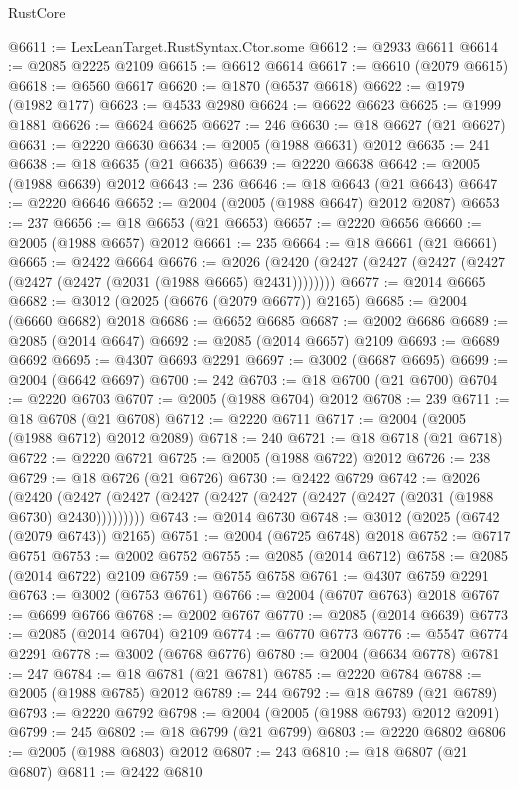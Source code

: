 \begin{lexlean}{RustCore}
\begin{coremodule}
@6611 := LexLeanTarget.RustSyntax.Ctor.some
@6612 := @2933 @6611
@6614 := @2085 @2225 @2109
@6615 := @6612 @6614
@6617 := @6610 (@2079 @6615)
@6618 := @6560 @6617
@6620 := @1870 (@6537 @6618)
@6622 := @1979 (@1982 @177)
@6623 := @4533 @2980
@6624 := @6622 @6623
@6625 := @1999 @1881
@6626 := @6624 @6625
@6627 := 246
@6630 := @18 @6627 (@21 @6627)
@6631 := @2220 @6630
@6634 := @2005 (@1988 @6631) @2012
@6635 := 241
@6638 := @18 @6635 (@21 @6635)
@6639 := @2220 @6638
@6642 := @2005 (@1988 @6639) @2012
@6643 := 236
@6646 := @18 @6643 (@21 @6643)
@6647 := @2220 @6646
@6652 := @2004 (@2005 (@1988 @6647) @2012 @2087)
@6653 := 237
@6656 := @18 @6653 (@21 @6653)
@6657 := @2220 @6656
@6660 := @2005 (@1988 @6657) @2012
@6661 := 235
@6664 := @18 @6661 (@21 @6661)
@6665 := @2422 @6664
@6676 := @2026 (@2420 (@2427 (@2427 (@2427 (@2427 (@2427 (@2427 (@2031 (@1988 @6665) @2431))))))))
@6677 := @2014 @6665
@6682 := @3012 (@2025 (@6676 (@2079 @6677)) @2165)
@6685 := @2004 (@6660 @6682) @2018
@6686 := @6652 @6685
@6687 := @2002 @6686
@6689 := @2085 (@2014 @6647)
@6692 := @2085 (@2014 @6657) @2109
@6693 := @6689 @6692
@6695 := @4307 @6693 @2291
@6697 := @3002 (@6687 @6695)
@6699 := @2004 (@6642 @6697)
@6700 := 242
@6703 := @18 @6700 (@21 @6700)
@6704 := @2220 @6703
@6707 := @2005 (@1988 @6704) @2012
@6708 := 239
@6711 := @18 @6708 (@21 @6708)
@6712 := @2220 @6711
@6717 := @2004 (@2005 (@1988 @6712) @2012 @2089)
@6718 := 240
@6721 := @18 @6718 (@21 @6718)
@6722 := @2220 @6721
@6725 := @2005 (@1988 @6722) @2012
@6726 := 238
@6729 := @18 @6726 (@21 @6726)
@6730 := @2422 @6729
@6742 := @2026
    (@2420 (@2427 (@2427 (@2427 (@2427 (@2427 (@2427 (@2427 (@2031 (@1988 @6730) @2430)))))))))
@6743 := @2014 @6730
@6748 := @3012 (@2025 (@6742 (@2079 @6743)) @2165)
@6751 := @2004 (@6725 @6748) @2018
@6752 := @6717 @6751
@6753 := @2002 @6752
@6755 := @2085 (@2014 @6712)
@6758 := @2085 (@2014 @6722) @2109
@6759 := @6755 @6758
@6761 := @4307 @6759 @2291
@6763 := @3002 (@6753 @6761)
@6766 := @2004 (@6707 @6763) @2018
@6767 := @6699 @6766
@6768 := @2002 @6767
@6770 := @2085 (@2014 @6639)
@6773 := @2085 (@2014 @6704) @2109
@6774 := @6770 @6773
@6776 := @5547 @6774 @2291
@6778 := @3002 (@6768 @6776)
@6780 := @2004 (@6634 @6778)
@6781 := 247
@6784 := @18 @6781 (@21 @6781)
@6785 := @2220 @6784
@6788 := @2005 (@1988 @6785) @2012
@6789 := 244
@6792 := @18 @6789 (@21 @6789)
@6793 := @2220 @6792
@6798 := @2004 (@2005 (@1988 @6793) @2012 @2091)
@6799 := 245
@6802 := @18 @6799 (@21 @6799)
@6803 := @2220 @6802
@6806 := @2005 (@1988 @6803) @2012
@6807 := 243
@6810 := @18 @6807 (@21 @6807)
@6811 := @2422 @6810

\end{coremodule}
\end{lexlean}
